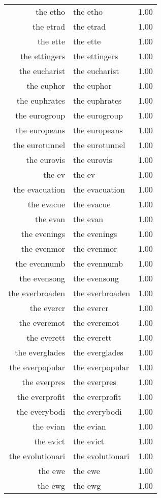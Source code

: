 \begin{table}[ht]
\begin{tabular}{rlr}
  the etho & the etho & 1.00 \\ 
  the etrad & the etrad & 1.00 \\ 
  the ette & the ette & 1.00 \\ 
  the ettingers & the ettingers & 1.00 \\ 
  the eucharist & the eucharist & 1.00 \\ 
  the euphor & the euphor & 1.00 \\ 
  the euphrates & the euphrates & 1.00 \\ 
  the eurogroup & the eurogroup & 1.00 \\ 
  the europeans & the europeans & 1.00 \\ 
  the eurotunnel & the eurotunnel & 1.00 \\ 
  the eurovis & the eurovis & 1.00 \\ 
  the ev & the ev & 1.00 \\ 
  the evacuation & the evacuation & 1.00 \\ 
  the evacue & the evacue & 1.00 \\ 
  the evan & the evan & 1.00 \\ 
  the evenings & the evenings & 1.00 \\ 
  the evenmor & the evenmor & 1.00 \\ 
  the evennumb & the evennumb & 1.00 \\ 
  the evensong & the evensong & 1.00 \\ 
  the everbroaden & the everbroaden & 1.00 \\ 
  the evercr & the evercr & 1.00 \\ 
  the everemot & the everemot & 1.00 \\ 
  the everett & the everett & 1.00 \\ 
  the everglades & the everglades & 1.00 \\ 
  the everpopular & the everpopular & 1.00 \\ 
  the everpres & the everpres & 1.00 \\ 
  the everprofit & the everprofit & 1.00 \\ 
  the everybodi & the everybodi & 1.00 \\ 
  the evian & the evian & 1.00 \\ 
  the evict & the evict & 1.00 \\ 
  the evolutionari & the evolutionari & 1.00 \\ 
  the ewe & the ewe & 1.00 \\ 
  the ewg & the ewg & 1.00 \\ 

\end{tabular}
\end{table}
